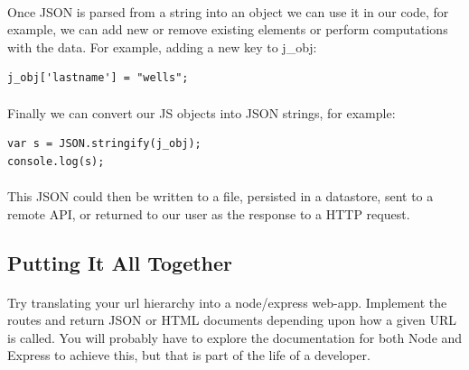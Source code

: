 \documentclass[10pt, a4paper, twosize]{article}
\begin{document}
\paragraph{} Once JSON is parsed from a string into an object we can use it in our code, for example, we can add new or remove existing elements or perform computations with the data. For example, adding a new key to j\_obj:

\begin{lstlisting}
j_obj['lastname'] = "wells";
\end{lstlisting}

\paragraph{} Finally we can convert our JS objects into JSON strings, for example:

\begin{lstlisting}
var s = JSON.stringify(j_obj);
console.log(s);
\end{lstlisting}

\paragraph{} This JSON could then be written to a file, persisted in a datastore, sent to a remote API, or returned to our user as the response to a HTTP request.





\subsection{Putting It All Together}
\paragraph{} Try translating your url hierarchy into a node/express web-app. Implement the routes and return JSON or HTML documents depending upon how a given URL is called. You will probably have to explore the documentation for both Node and Express to achieve this, but that is part of the life of a developer.
\end{document}

